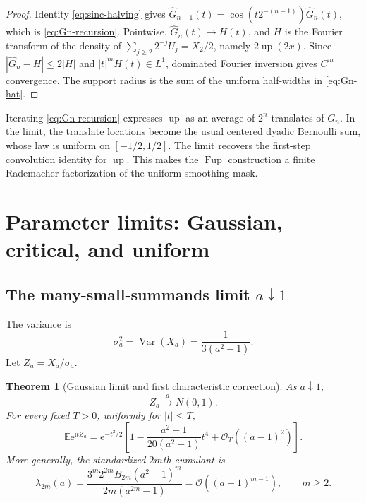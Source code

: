 \documentclass[11pt,oneside]{article}
\newtheorem{theorem}{Theorem}[section]
\theoremstyle{definition}
\theoremstyle{remark}
\newcommand{\Up}{\operatorname{up}}
\newcommand{\e}{\mathrm e}
\newcommand{\ii}{\mathrm i}
\newcommand{\Var}{\operatorname{Var}}
\newcommand{\E}{\mathbb E}
\newcommand{\bigO}{\mathcal O}
\begin{document}
\begin{proof}
Identity \eqref{eq:sinc-halving} gives
$\widehat G_{n-1}(t)=\cos(t2^{-(n+1)})\widehat G_n(t)$, which is
\eqref{eq:Gn-recursion}.  Pointwise,
$\widehat G_n(t)\to H(t)$, and $H$ is the Fourier transform of the density of
$\sum_{j\ge2}2^{-j}U_j=X_2/2$, namely $2\Up(2x)$.  Since
$|\widehat G_n-H|\le2|H|$ and $|t|^mH(t)\in L^1$, dominated Fourier inversion gives
$C^m$ convergence.  The support radius is the sum of the uniform half-widths in
\eqref{eq:Gn-hat}.
\end{proof}

Iterating \eqref{eq:Gn-recursion} expresses $\Up$ as an average of $2^n$ translates of
$G_n$.  In the limit, the translate locations become the usual centered dyadic Bernoulli
sum, whose law is uniform on $[-1/2,1/2]$.  The limit recovers the first-step convolution
identity for $\Up$.  This makes the $\operatorname{Fup}$ construction a finite Rademacher
factorization of the uniform smoothing mask.

\section{Parameter limits: Gaussian, critical, and uniform}
\label{sec:parameter-limits}

\subsection{The many-small-summands limit $a\downarrow1$}

The variance is
\begin{equation}
 \sigma_a^2=\Var(X_a)=\frac1{3(a^2-1)}.
 \label{eq:variance-a}
\end{equation}
Let $Z_a=X_a/\sigma_a$.

\begin{theorem}[Gaussian limit and first characteristic correction]
\label{thm:gaussian-limit}
As $a\downarrow1$,
\begin{equation}
 Z_a\xrightarrow{\ d\ }N(0,1).
 \label{eq:Gaussian-limit}
\end{equation}
For every fixed $T>0$, uniformly for $|t|\le T$,
\begin{equation}
 \E\e^{\ii tZ_a}
 =\e^{-t^2/2}\left[
 1-\frac{a^2-1}{20(a^2+1)}t^4
 +\bigO_T((a-1)^2)
 \right].
 \label{eq:Gaussian-first-correction}
\end{equation}
More generally, the standardized $2m$th cumulant is
\begin{equation}
 \lambda_{2m}(a)=
 \frac{3^m2^{2m}B_{2m}(a^2-1)^m}{2m(a^{2m}-1)}
 =\bigO((a-1)^{m-1}),\qquad m\ge2.
 \label{eq:standardized-cumulant}
\end{equation}
\end{theorem}
\end{document}
